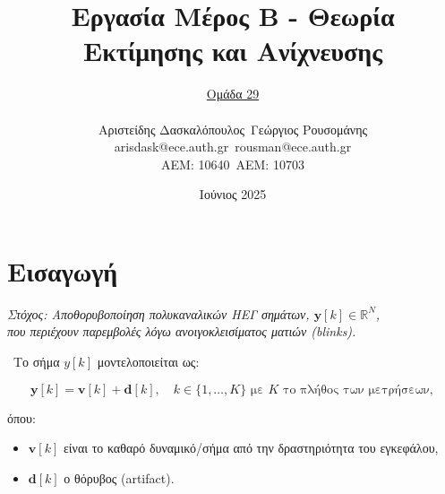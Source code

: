\documentclass[12pt]{article} %
\title{Εργασία Μέρος Β - Θεωρία Εκτίμησης και Ανίχνευσης}
\author{%
  \underline{Ομάδα 29} \\
  \begin{tabular}{ccc}
  Αριστείδης Δασκαλόπουλος & \  & Γεώργιος Ρουσομάνης \\
  arisdask@ece.auth.gr & \  & rousman@ece.auth.gr \\ 
  ΑΕΜ: 10640 & \  & ΑΕΜ: 10703
  \end{tabular}
}
\date{Ιούνιος 2025}
\begin{document}
\maketitle

\section*{Εισαγωγή}

\begin{center}
    \textit{Στόχος: Αποθορυβοποίηση πολυκαναλικών ΗΕΓ σημάτων, $\mathbf{y}[k] \in \mathbb{R}^N$, \\ που περιέχουν παρεμβολές λόγω ανοιγοκλεισίματος ματιών (blinks).}
\end{center}

\noindent\textrightarrow\ Το σήμα $y[k]$ μοντελοποιείται ως:

\vspace{-8pt}

\[
\mathbf{y}[k] = \mathbf{v}[k] + \mathbf{d}[k], \quad\text{$k \in \{1, \ldots, K\}$ με $K$ το πλήθος των μετρήσεων},
\]

\vspace{-5pt}

όπου: 
\begin{itemize}[noitemsep, nolistsep]
    \item $\mathbf{v}[k]$ είναι το καθαρό δυναμικό/σήμα από την δραστηριότητα του εγκεφάλου,
    \item $\mathbf{d}[k]$ ο θόρυβος (artifact).
\end{itemize}

\vspace{+10pt}
\end{document}
